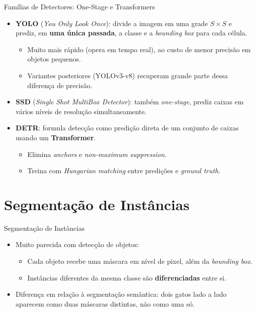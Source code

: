 \documentclass[aspectratio=169,xcolor=dvipsnames]{beamer}
\begin{document}
\begin{frame}{Famílias de Detectores: One-Stage e Transformers}
\begin{itemize}
    \item \textbf{YOLO} (\textit{You Only Look Once}): divide a imagem em uma grade $S\times S$ e prediz, em \textbf{uma única passada}, a classe e a \textit{bounding box} para cada célula.
    \begin{itemize}
        \item Muito mais rápido (opera em tempo real), ao custo de menor precisão em objetos pequenos.
        \item Variantes posteriores (YOLOv3-v8) recuperam grande parte dessa diferença de precisão.
    \end{itemize}
    \item \textbf{SSD} (\textit{Single Shot MultiBox Detector}): também \textit{one-stage}, prediz caixas em vários níveis de resolução simultaneamente.
    \item \textbf{DETR}: formula detecção como predição direta de um conjunto de caixas usando um \textbf{Transformer}.
    \begin{itemize}
        \item Elimina \textit{anchors} e \textit{non-maximum suppression}.
        \item Treina com \textit{Hungarian matching} entre predições e \textit{ground truth}.
    \end{itemize}
\end{itemize}
\end{frame}

\section{Segmentação de Instâncias}

\begin{frame}{Segmentação de Instâncias}
\begin{itemize}
    \item Muito parecida com detecção de objetos:
    \begin{itemize}
        \item Cada objeto recebe uma máscara em nível de pixel, além da \textit{bounding box}.
        \item Instâncias diferentes da mesma classe são \textbf{diferenciadas} entre si.
    \end{itemize}
    \item Diferença em relação à segmentação semântica: dois gatos lado a lado aparecem como duas máscaras distintas, não como uma só.
\end{itemize}
\end{frame}
\end{document}
